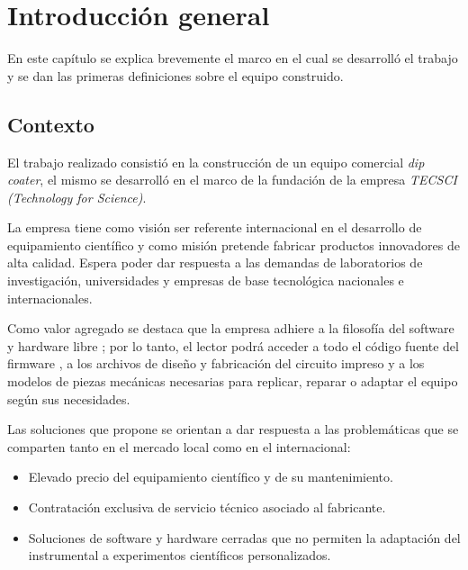 
\chapter{Introducción general} %

\label{Chapter1} %


En este capítulo se explica brevemente el marco en el cual se desarrolló el trabajo y se dan las primeras definiciones sobre el equipo construido. 
\section{Contexto}

El trabajo realizado consistió en la construcción de un equipo comercial \textit{dip coater}, el mismo se desarrolló en el marco de la fundación de la empresa \textit{TECSCI (Technology for Science)}\citep{web_tecsci}.

La empresa tiene como visión ser referente internacional en el desarrollo de equipamiento científico y como misión pretende fabricar productos innovadores de alta calidad. Espera poder dar respuesta a las demandas de laboratorios de investigación, universidades y empresas de base tecnológica nacionales e internacionales.

Como valor agregado se destaca que la empresa adhiere a la filosofía del software y hardware libre \citep{web_oshwa}; por lo tanto, el lector podrá acceder a todo el código fuente del firmware \citep{web_firmware_tecsci}, a los archivos de diseño y fabricación del circuito impreso \citep{web_hardware_tecsci} y a los modelos de piezas mecánicas necesarias para replicar, reparar o adaptar el equipo según sus necesidades.

Las soluciones que propone se orientan a dar respuesta a las problemáticas que se comparten tanto en el mercado local como en el internacional:
\begin{itemize}
\item Elevado precio del equipamiento científico y de su mantenimiento.
\item Contratación exclusiva de servicio técnico asociado al fabricante.
\item Soluciones de software y hardware cerradas que no permiten la adaptación del instrumental a experimentos científicos personalizados.
\end{itemize}


